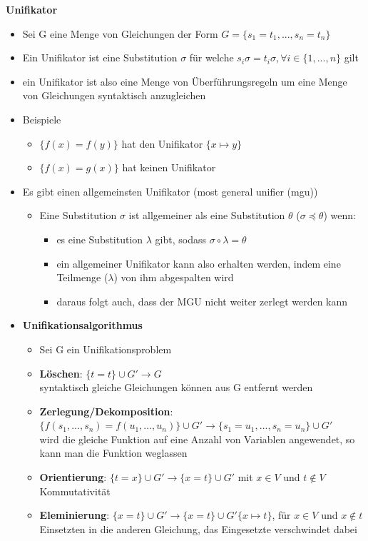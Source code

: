 \documentclass[12pt,a4paper]{article}
\begin{document}
\textbf{Unifikator}\\
\begin{itemize}
\item Sei G eine Menge von Gleichungen der Form $G = \{ s_1 = t_1, ..., s_n = t_n \}$
\item Ein Unifikator ist eine Substitution $\sigma$ für welche $s_i\sigma = t_i\sigma, \forall i\in \{1,...,n\}$ gilt
\item ein Unifikator ist also eine Menge von Überführungsregeln um eine Menge von Gleichungen syntaktisch anzugleichen
\item Beispiele
\begin{itemize}
\item $\{f(x) = f(y)\}$ hat den Unifikator $\{x\mapsto y\}$
\item $\{f(x) = g(x) \}$ hat keinen Unifikator
\end{itemize} 
\item Es gibt einen allgemeinsten Unifikator (most general unifier (mgu))
\begin{itemize}
\item Eine Substitution $\sigma$ ist allgemeiner als eine Substitution $\theta$ ($\sigma \preceq \theta$) wenn:
\begin{itemize}
\item es eine Substitution $\lambda$ gibt, sodass $\sigma \circ \lambda = \theta$
\item ein allgemeiner Unifikator kann also erhalten werden, indem eine Teilmenge ($\lambda$) von ihm abgespalten wird
\item daraus folgt auch, dass der MGU nicht weiter zerlegt werden kann
\end{itemize}
\end{itemize}
\item \textbf{Unifikationsalgorithmus}
\begin{itemize}
\item Sei G ein Unifikationsproblem
\item \textbf{Löschen}: $\{t = t\} \cup G' \rightarrow G$\\
 syntaktisch gleiche Gleichungen können aus G entfernt werden
\item \textbf{Zerlegung/Dekomposition}: $\{f(s_1,...,s_n) = f(u_1,...,u_n)\} \cup G' \rightarrow \{s_1 = u_1,...,s_n=u_n\} \cup G'$\\
wird die gleiche Funktion auf eine Anzahl von Variablen angewendet, so kann man die Funktion weglassen
\item \textbf{Orientierung}: $\{t=x\} \cup G' \rightarrow \{ x=t\} \cup G'$ mit $x\in V$ und $t\not\in V$\\
Kommutativität
\item \textbf{Eleminierung}: $\{x=t\} \cup G' \rightarrow \{x=t\} \cup G'\{x\mapsto t\}$, für $x\in V$ und $x \not\in t$\\
Einsetzten in die anderen Gleichung, das Eingesetzte verschwindet dabei
\end{itemize}
\end{itemize}
\end{document}
